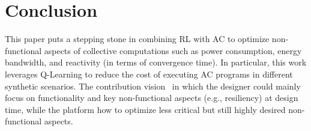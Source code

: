 \section{Conclusion}\label{sec:conclusion}


This paper puts a stepping stone in combining \ac{RL} with \ac{AC} 
 to optimize non-functional aspects of collective computations such as power consumption, 
 energy bandwidth, and reactivity (in terms of convergence time). 
%
In particular, this work leverages Q-Learning 
 to reduce the cost of executing \ac{AC} programs 
 in different synthetic scenarios.
%
The contribution  vision~ in which 
 the designer could mainly focus on functionality and key non-functional aspects (e.g., resiliency)
 at design time, while the platform  how 
 to optimize less critical but still highly desired non-functional aspects. %

